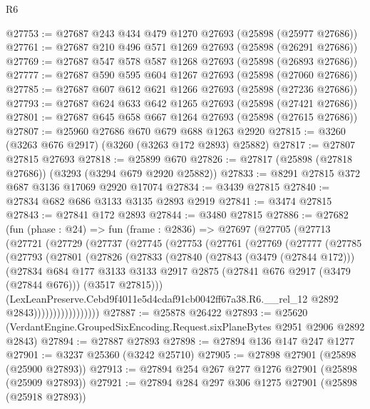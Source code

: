 \begin{lexlean}{R6}
\begin{coremodule}
@27753 := @27687 @243 @434 @479 @1270 @27693 (@25898 (@25977 @27686))
@27761 := @27687 @210 @496 @571 @1269 @27693 (@25898 (@26291 @27686))
@27769 := @27687 @547 @578 @587 @1268 @27693 (@25898 (@26893 @27686))
@27777 := @27687 @590 @595 @604 @1267 @27693 (@25898 (@27060 @27686))
@27785 := @27687 @607 @612 @621 @1266 @27693 (@25898 (@27236 @27686))
@27793 := @27687 @624 @633 @642 @1265 @27693 (@25898 (@27421 @27686))
@27801 := @27687 @645 @658 @667 @1264 @27693 (@25898 (@27615 @27686))
@27807 := @25960 @27686 @670 @679 @688 @1263 @2920
@27815 := @3260 (@3263 @676 @2917) (@3260 (@3263 @172 @2893) @25882)
@27817 := @27807 @27815 @27693
@27818 := @25899 @670
@27826 := @27817 (@25898 (@27818 @27686)) (@3293 (@3294 @679 @2920 @25882))
@27833 := @8291 @27815 @372 @687 @3136 @17069 @2920 @17074
@27834 := @3439 @27815
@27840 := @27834 @682 @686 @3133 @3135 @2893 @2919
@27841 := @3474 @27815
@27843 := @27841 @172 @2893
@27844 := @3480 @27815
@27886 := @27682
    (fun (phase : @24) =>
    fun (frame : @2836) =>
    @27697
      (@27705
        (@27713
          (@27721
            (@27729
              (@27737
                (@27745
                  (@27753
                    (@27761
                      (@27769
                        (@27777
                          (@27785
                            (@27793
                              (@27801
                                (@27826
                                  (@27833
                                    (@27840
                                      (@27843 (@3479 (@27844 @172)))
                                      (@27834
                                        @684
                                        @177
                                        @3133
                                        @3133
                                        @2917
                                        @2875
                                        (@27841 @676 @2917 (@3479 (@27844 @676)))
                                        (@3517 @27815)))
                                    (LexLeanPreserve.Cebd9f4011e5d4cdaf91cb0042ff67a38.R6.__rel_12
                                      @2892
                                      @2843)))))))))))))))))
@27887 := @25878 @26422
@27893 := @25620 (VerdantEngine.GroupedSixEncoding.Request.sixPlaneBytes @2951 @2906 @2892 @2843)
@27894 := @27887 @27893
@27898 := @27894 @136 @147 @247 @1277
@27901 := @3237 @25360 (@3242 @25710)
@27905 := @27898 @27901 (@25898 (@25900 @27893))
@27913 := @27894 @254 @267 @277 @1276 @27901 (@25898 (@25909 @27893))
@27921 := @27894 @284 @297 @306 @1275 @27901 (@25898 (@25918 @27893))

\end{coremodule}
\end{lexlean}
